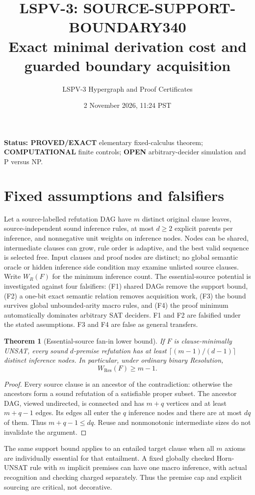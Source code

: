 \documentclass[11pt]{article}
\title{LSPV-3: SOURCE-SUPPORT-BOUNDARY340\\Exact minimal derivation cost and guarded boundary acquisition}
\author{LSPV-3 Hypergraph and Proof Certificates}
\date{2 November 2026, 11:24 PST}
\newtheorem{theorem}{Theorem}
\begin{document}
\maketitle
\noindent\textbf{Status: PROVED/EXACT} elementary fixed-calculus theorem; \textbf{COMPUTATIONAL} finite controls; \textbf{OPEN} arbitrary-decider simulation and P versus NP.

\section{Fixed assumptions and falsifiers}
Let a source-labelled refutation DAG have $m$ distinct original clause leaves, source-independent sound inference rules, at most $d\ge2$ explicit parents per inference, and nonnegative unit weights on inference nodes. Nodes can be shared, intermediate clauses can grow, rule order is adaptive, and the best valid sequence is selected free. Input clauses and proof nodes are distinct; no global semantic oracle or hidden inference side condition may examine unlisted source clauses. Write $W_R(F)$ for the minimum inference count. The essential-source potential is investigated against four falsifiers: (F1) shared DAGs remove the support bound, (F2) a one-bit exact semantic relation removes acquisition work, (F3) the bound survives global unbounded-arity macro rules, and (F4) the proof minimum automatically dominates arbitrary SAT deciders. F1 and F2 are falsified under the stated assumptions. F3 and F4 are false as general transfers.

\begin{theorem}[Essential-source fan-in lower bound]
If $F$ is clause-minimally UNSAT, every sound $d$-premise refutation has at least $\lceil(m-1)/(d-1)\rceil$ distinct inference nodes. In particular, under ordinary binary Resolution,
\[
W_{\mathrm{Res}}(F)\ge m-1.
\]
\end{theorem}
\begin{proof}
Every source clause is an ancestor of the contradiction: otherwise the ancestors form a sound refutation of a satisfiable proper subset. The ancestor DAG, viewed undirected, is connected and has $m+q$ vertices and at least $m+q-1$ edges. Its edges all enter the $q$ inference nodes and there are at most $dq$ of them. Thus $m+q-1\le dq$. Reuse and nonmonotonic intermediate sizes do not invalidate the argument.
\end{proof}
The same support bound applies to an entailed target clause when all $m$ axioms are individually essential for that entailment. A fixed globally checked Horn-UNSAT rule with $m$ implicit premises can have one macro inference, with actual recognition and checking charged separately. Thus the premise cap and explicit sourcing are critical, not decorative.
\end{document}
